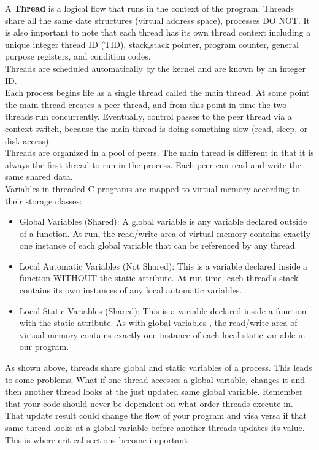 

A {\bf Thread} is a logical flow that runs in the context of the program.  Threads share all the same date structures (virtual address space), processes DO NOT.  It is also important to note that each thread has its own thread context including a unique integer thread ID (TID), stack,stack pointer, program counter, general purpose registers, and condition codes.\\

Threads  are scheduled automatically by the kernel and are known by an integer ID.\\
Each process begins life as a single thread called the main thread.  At some point the main thread creates a peer thread, and from this point in time the two threads run concurrently.  Eventually, control passes to the peer thread via a context switch, because the main thread is doing something slow (read, sleep, or disk access).\\

Threads are organized in a pool of peers.  The main thread is different in that it is always the first thread to run in the process.  Each peer can read and write the same shared data.\\

Variables in threaded C programs are mapped to virtual memory according to their storage classes:
\begin{itemize}
\item Global Variables (Shared):  A global variable is any variable declared outside of a function.  At run, the read/write area of virtual memory contains exactly one instance of each global variable that can be referenced by any thread.
\item Local Automatic Variables (Not Shared): This is a variable declared inside a function WITHOUT the static attribute.  At run time, each thread's stack contains its own instances of any local automatic variables.
\item Local Static Variables (Shared):  This is a variable declared inside a function with the static attribute.  As with global variables , the read/write area of virtual memory contains exactly one instance of each local static variable in our program.
\end{itemize}


As shown above, threads share global and static variables of a process.  This leads to some problems.  What if one thread accesses a global variable, changes it and then another thread looks at the just updated same global variable.  Remember that your code should never be dependent on what order threads execute in.  That update result could change the flow of your program and visa versa if that same thread looks at a global variable before another threads updates its value.  This is where critical sections become important.\\

